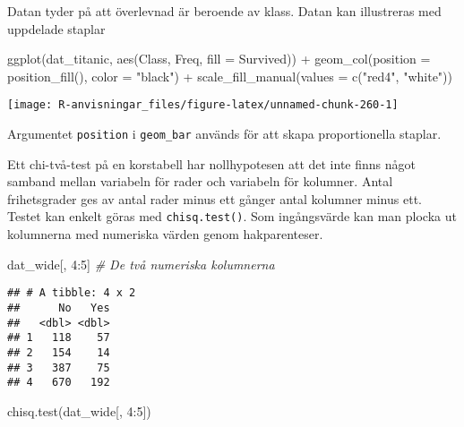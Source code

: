 \documentclass[
]{book}
\newenvironment{Shaded}{\begin{snugshade}}{\end{snugshade}}
\newcommand{\AttributeTok}[1]{\textcolor[rgb]{0.77,0.63,0.00}{#1}}
\newcommand{\CommentTok}[1]{\textcolor[rgb]{0.56,0.35,0.01}{\textit{#1}}}
\newcommand{\DecValTok}[1]{\textcolor[rgb]{0.00,0.00,0.81}{#1}}
\newcommand{\FunctionTok}[1]{\textcolor[rgb]{0.00,0.00,0.00}{#1}}
\newcommand{\NormalTok}[1]{#1}
\newcommand{\SpecialCharTok}[1]{\textcolor[rgb]{0.00,0.00,0.00}{#1}}
\newcommand{\StringTok}[1]{\textcolor[rgb]{0.31,0.60,0.02}{#1}}
\theoremstyle{definition}
\theoremstyle{definition}
\theoremstyle{definition}
\theoremstyle{definition}
\theoremstyle{remark}
\begin{document}
Datan tyder på att överlevnad är beroende av klass. Datan kan illustreras med uppdelade staplar

\begin{Shaded}
\begin{Highlighting}[]
\FunctionTok{ggplot}\NormalTok{(dat\_titanic, }\FunctionTok{aes}\NormalTok{(Class, Freq, }\AttributeTok{fill =}\NormalTok{ Survived)) }\SpecialCharTok{+}
  \FunctionTok{geom\_col}\NormalTok{(}\AttributeTok{position =} \FunctionTok{position\_fill}\NormalTok{(), }\AttributeTok{color =} \StringTok{"black"}\NormalTok{) }\SpecialCharTok{+}
  \FunctionTok{scale\_fill\_manual}\NormalTok{(}\AttributeTok{values =} \FunctionTok{c}\NormalTok{(}\StringTok{"red4"}\NormalTok{, }\StringTok{"white"}\NormalTok{))}
\end{Highlighting}
\end{Shaded}

\begin{center}\texttt{[image: R-anvisningar\_files/figure-latex/unnamed-chunk-260-1]} \end{center}

Argumentet \texttt{position} i \texttt{geom\_bar} används för att skapa proportionella staplar.

Ett chi-två-test på en korstabell har nollhypotesen att det inte finns något samband mellan variabeln för rader och variabeln för kolumner. Antal frihetsgrader ges av antal rader minus ett gånger antal kolumner minus ett. Testet kan enkelt göras med \texttt{chisq.test()}. Som ingångsvärde kan man plocka ut kolumnerna med numeriska värden genom hakparenteser.

\begin{Shaded}
\begin{Highlighting}[]
\NormalTok{dat\_wide[, }\DecValTok{4}\SpecialCharTok{:}\DecValTok{5}\NormalTok{] }\CommentTok{\# De två numeriska kolumnerna}
\end{Highlighting}
\end{Shaded}

\begin{verbatim}
## # A tibble: 4 x 2
##      No   Yes
##   <dbl> <dbl>
## 1   118    57
## 2   154    14
## 3   387    75
## 4   670   192
\end{verbatim}

\begin{Shaded}
\begin{Highlighting}[]
\FunctionTok{chisq.test}\NormalTok{(dat\_wide[, }\DecValTok{4}\SpecialCharTok{:}\DecValTok{5}\NormalTok{])}
\end{Highlighting}
\end{Shaded}
\end{document}
